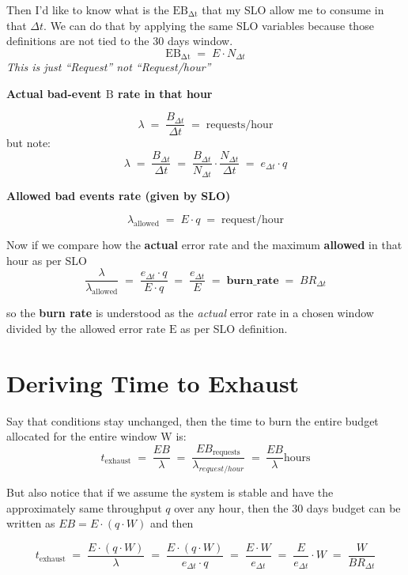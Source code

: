 \documentclass{article}
\begin{document}
Then I'd like to know what is the $\mathrm{EB_{\Delta t}}$ that my SLO allow me to consume in that $\Delta t$. We can do that by applying the same SLO variables because those definitions are not tied to the 30 days window.
\[
\mathrm{EB_{\Delta t}} \;=\; E \cdot N_{\Delta t}
\]
\emph{This is just ``Request'' not ``Request/hour''}

\quad

\noindent \textbf{Actual bad-event $\mathrm{B}$ rate in that hour}

\[
\lambda \;=\; \frac{B_{\Delta t}}{\Delta t} \;=\; \text{requests/hour}
\]
but note:
\[
\lambda \;=\; \frac{B_{\Delta t}}{\Delta t} \;=\; \frac{B_{\Delta t}}{N_{\Delta t}} \cdot \frac{N_{\Delta t}}{\Delta t} \;=\; e_{\Delta t} \cdot q
\]

\noindent \textbf{Allowed bad events rate (given by SLO)}

\[
\lambda_{\text{allowed}} \;=\; E \cdot q \;=\; \text{request/hour}
\]

\noindent Now if we compare how the \textbf{actual} error rate and the maximum \textbf{allowed} in that hour as per SLO
\[
\frac{\lambda}{\lambda_{\text{allowed}}} \;=\; \frac{e_{\Delta t} \cdot q}{E \cdot q} \;=\; \frac{e_{\Delta t}}{E} \;=\; \textbf{burn\_rate} \;=\; BR_{\Delta t}
\]

so the \textbf{burn rate} is understood as the \emph{actual} error rate in a chosen window divided by the allowed error rate $\mathrm{E}$ as per SLO definition.

\section{Deriving Time to Exhaust}

Say that conditions stay unchanged, then the time to burn the entire budget allocated for the entire window $\mathrm{W}$ is:
\[
t_{\text{exhaust}} \;=\; \frac{EB}{\lambda} \;=\; \frac{EB_{\text{requests}}}{\lambda_{request/hour}} \;=\ \frac{EB}{\lambda} \text{hours}
\]

\noindent But also notice that if we assume the system is stable and have the approximately same throughput $q$ over any hour, then the 30 days budget can be written as $EB = E \cdot (q \cdot W)$ and then

\[
t_{\text{exhaust}} \;=\; \frac{E \cdot (q \cdot W)}{\lambda} \;=\; \frac{E \cdot (q \cdot W)}{e_{\Delta t} \cdot q} \;=\; \frac{E \cdot W}{e_{\Delta t}} \;=\; \frac{E}{e_{\Delta t}} \cdot W \;=\; \frac{W}{BR_{\Delta t}}
\]
\end{document}
